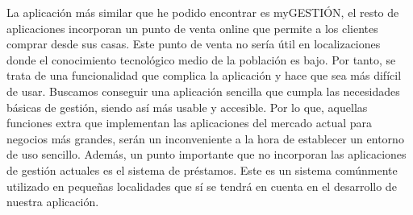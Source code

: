 La aplicación más similar que he podido encontrar es myGESTIÓN, el resto de aplicaciones incorporan un punto de venta online que permite a los clientes comprar desde sus casas. Este punto de venta no sería útil en localizaciones donde el conocimiento tecnológico medio de la población es bajo. Por tanto, se trata de una funcionalidad que complica la aplicación y hace que sea más difícil de usar. Buscamos conseguir una aplicación sencilla que cumpla las necesidades básicas de gestión, siendo así más usable y accesible. Por lo que, aquellas funciones extra que implementan las aplicaciones del mercado actual para negocios más grandes, serán un inconveniente a la hora de establecer un entorno de uso sencillo. Además, un punto importante que no incorporan las aplicaciones de gestión actuales es el sistema de préstamos. Este es un sistema comúnmente utilizado en pequeñas localidades que sí se tendrá en cuenta en el desarrollo de nuestra aplicación. 


